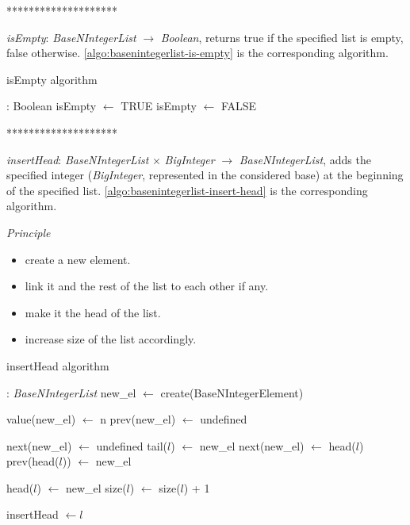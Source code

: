 \documentclass[book, nodocumentinfo]{upmethodology-document}
\newcommand{\separator}{\centerline{********************}}
\begin{document}
\separator

\emph{isEmpty}: \emph{BaseNIntegerList} \(\rightarrow\) \emph{Boolean},
returns true if the specified list is empty, false otherwise.
\ref{algo:basenintegerlist-is-empty} is the corresponding algorithm.

\begin{algorithm}[H]
    \caption{isEmpty algorithm}
    \label{algo:basenintegerlist-is-empty}

    \begin{algorithmic}
         : Boolean
                \State isEmpty \(\leftarrow\) TRUE
            \Else
                \State isEmpty \(\leftarrow\) FALSE
            \EndIf
        \EndFunction
    \end{algorithmic}
\end{algorithm}

\separator

\emph{insertHead}: \emph{BaseNIntegerList} \(×\) \emph{BigInteger} \(\rightarrow\) \emph{BaseNIntegerList},
adds the specified integer (\emph{BigInteger}, represented in the considered base) at the beginning
of the specified list.
\ref{algo:basenintegerlist-insert-head} is the corresponding algorithm.

\emph{Principle}
\begin{itemize}
    \item create a new element.
    \item link it and the rest of the list to each other if any.
    \item make it the head of the list.
    \item increase size of the list accordingly.
\end{itemize}

\begin{algorithm}[H]
    \caption{insertHead algorithm}
    \label{algo:basenintegerlist-insert-head}

    \begin{algorithmic}
         : \emph{BaseNIntegerList}
            \State new\_el \(\leftarrow\) create(BaseNIntegerElement)

            \State value(new\_el) \(\leftarrow\) n
            \State prev(new\_el) \(\leftarrow\) undefined

                \State next(new\_el) \(\leftarrow\) undefined
                \State tail(\(l\)) \(\leftarrow\) new\_el
            \Else
                \State next(new\_el) \(\leftarrow\) head(\(l\))
                \State prev(head(\(l\))) \(\leftarrow\) new\_el
            \EndIf

            \State head(\(l\)) \(\leftarrow\) new\_el
            \State size(\(l\)) \(\leftarrow\) size(\(l\)) + 1

            \State insertHead \(\leftarrow l\)
        \EndFunction
    \end{algorithmic}
\end{algorithm}
\end{document}
